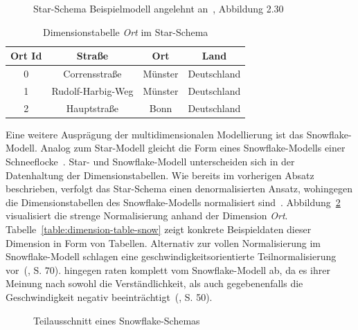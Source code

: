 \documentclass[
  language=german, %
  type=bachelor,%
  ngerman
]{isthesis}
\begin{document}
\begin{content}
  \begin{figure}
    \resizebox{0.6\linewidth}{!}{}
    \caption[Star-Schema Beispielmodell]{Star-Schema Beispielmodell angelehnt an~\textsc{\cite{Kemper2010}}, Abbildung 2.30}\label{fig:star-schema}
  \end{figure}

  \begin{table}[]
    \footnotesize
    \begin{tabular}{c c c c}
      Ort Id & Straße & Ort & Land \\
      \toprule
      0 & Corrensstraße & Münster & Deutschland \\
      1 & Rudolf-Harbig-Weg & Münster & Deutschland \\
      2 & Hauptstraße & Bonn & Deutschland \\
    \end{tabular}
    \caption{Dimensionstabelle \textit{Ort} im Star-Schema}\label{table:dimension-table}
  \end{table}

  Eine weitere Ausprägung der multidimensionalen Modellierung ist das
  Snowflake-Modell.  Analog zum Star-Modell gleicht die Form eines
  Snowflake-Modells einer Schneeflocke~\cite[][S. 70]{Kemper2010}. Star- und
  Snowflake-Modell unterscheiden sich in der Datenhaltung der
  Dimensionstabellen. Wie bereits im vorherigen Absatz beschrieben, verfolgt
  das Star-Schema einen denormalisierten Ansatz, wohingegen die
  Dimensionstabellen des Snowflake-Modells normalisiert sind~\cite[][S.
  70]{Kemper2010}. Abbildung~\ref{fig:snowflake-schema} visualisiert die
  strenge Normalisierung anhand der Dimension \textit{Ort}.
  Tabelle~\ref{table:dimension-table-snow} zeigt konkrete Beispieldaten
  dieser Dimension in Form von Tabellen.  Alternativ zur vollen Normalisierung
  im Snowflake-Modell schlagen \textsc{\citeauthor{Kemper2010}} eine
  geschwindigkeitsorientierte Teilnormalisierung vor~(\citeyear{Kemper2010}, S.
  70).  \textsc{\citeauthor{Kimball2013}} hingegen raten komplett vom
  Snowflake-Modell ab, da es ihrer Meinung nach sowohl die Verständlichkeit, als
  auch gegebenenfalls die Geschwindigkeit negativ
  beeinträchtigt~(\citeyear{Kimball2013}, S. 50).

  \begin{figure}
    \resizebox{250pt}{!}{}
    \caption{Teilausschnitt eines Snowflake-Schemas}\label{fig:snowflake-schema}
  \end{figure}


\end{content}
\end{document}
